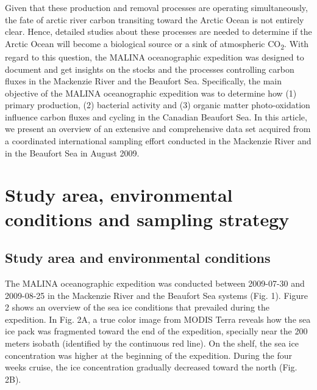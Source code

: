 \documentclass[essd, manuscript]{copernicus}
\begin{document}
Given that these production and removal processes are operating simultaneously, the fate of arctic river carbon transiting toward the Arctic Ocean is not entirely clear. Hence, detailed studies about these processes are needed to determine if the Arctic Ocean will become a biological source or a sink of atmospheric CO\textsubscript{2}. With regard to this question, the MALINA oceanographic expedition was designed to document and get insights on the stocks and the processes controlling carbon fluxes in the Mackenzie River and the Beaufort Sea. Specifically, the main objective of the MALINA oceanographic expedition was to determine how (1) primary production, (2) bacterial activity and (3) organic matter photo-oxidation influence carbon fluxes and cycling in the Canadian Beaufort Sea. In this article, we present an overview of an extensive and comprehensive data set acquired from a coordinated international sampling effort conducted in the Mackenzie River and in the Beaufort Sea in August 2009.

\section{Study area, environmental conditions and sampling strategy}

\subsection{Study area and environmental conditions}

The MALINA oceanographic expedition was conducted between 2009-07-30 and 2009-08-25 in the Mackenzie River and the Beaufort Sea systems (Fig. 1). Figure 2 shows an overview of the sea ice conditions that prevailed during the expedition. In Fig. 2A, a true color image from MODIS Terra reveals how the sea ice pack was fragmented toward the end of the expedition, specially near the 200 meters isobath (identified by the continuous red line). On the shelf, the sea ice concentration was higher at the beginning of the expedition. During the four weeks cruise, the ice concentration gradually decreased toward the north (Fig. 2B). 
\end{document}
